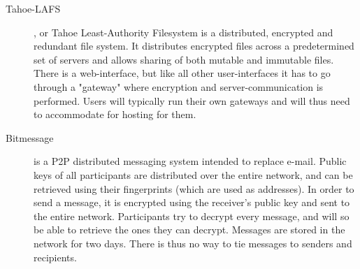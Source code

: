 \begin{description}
  \item[Tahoe-LAFS] \cite{Tahoe:2014:Online}, or Tahoe Least-Authority Filesystem is a distributed, encrypted and redundant file system. It distributes encrypted files across a predetermined set of servers and allows sharing of both mutable and immutable files. There is a web-interface, but like all other user-interfaces it has to go through a "gateway" where encryption and server-communication is performed. Users will typically run their own gateways and will thus need to accommodate for hosting for them. 
  \item[Bitmessage] \cite{Bitmessage:2014:Online} is a P2P distributed messaging system intended to replace e-mail. Public keys of all participants are distributed over the entire network, and can be retrieved using their fingerprints (which are used as addresses). In order to send a message, it is encrypted using the receiver's public key and sent to the entire network. Participants try to decrypt every message, and will so be able to retrieve the ones they can decrypt. Messages are stored in the network for two days. There is thus no way to tie messages to senders and recipients.
\end{description}

